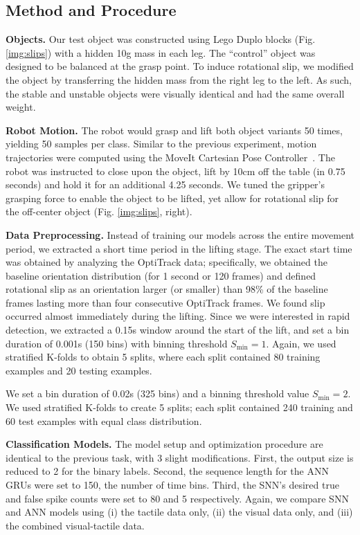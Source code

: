 \documentclass[fyp]{socreport}
\begin{document}
\subsection{Method and Procedure}

\noindent\textbf{Objects.} Our test object was constructed using Lego Duplo
blocks (Fig. \ref{img:slips}) with a hidden 10g mass in each leg. The
``control'' object was designed to be balanced at the grasp point. To induce
rotational slip, we modified the object by transferring the hidden mass from the
right leg to the left. As such, the stable and unstable objects were visually
identical and had the same overall weight.

\vspace{0.3em}
\noindent\textbf{Robot Motion.} The robot would grasp and lift both object
variants 50 times, yielding 50 samples per class. Similar to the previous
experiment, motion trajectories were computed using the MoveIt Cartesian Pose
Controller~\cite{coleman2014reducing}. The robot was instructed to close upon
the object, lift by 10cm off the table (in 0.75 seconds) and hold it for an
additional 4.25 seconds. We tuned the gripper's grasping force to enable the
object to be lifted, yet allow for rotational slip for the off-center object
(Fig. \ref{img:slips}, right).

\vspace{0.3em}
\noindent\textbf{Data Preprocessing.} Instead of training our models across the
entire movement period, we extracted a short time period in the lifting stage.
The exact start time was obtained by analyzing the OptiTrack data; specifically,
we obtained the baseline orientation distribution (for 1 second or 120 frames)
and defined rotational slip as an orientation larger (or smaller) than 98\% of
the baseline frames lasting more than four consecutive OptiTrack frames. We
found slip occurred almost immediately during the lifting. Since we were
interested in rapid detection, we extracted a 0.15s window around the start of
the lift, and set a bin duration of 0.001s (150 bins) with binning threshold
$S_\text{min} = 1$. Again, we used stratified K-folds to obtain 5 splits, where
each split contained 80 training examples and 20 testing examples.

We set a bin duration of 0.02s (325 bins) and a binning threshold value
$S_{\text{min}} = 2$. We used stratified K-folds to create 5 splits; each split
contained 240 training and 60 test examples with equal class distribution.

\vspace{0.3em}
\noindent\textbf{Classification Models.} The model setup and optimization
procedure are identical to the previous task, with 3 slight modifications.
First, the output size is reduced to 2 for the binary labels. Second, the
sequence length for the ANN GRUs were set to 150, the number of time bins.
Third, the SNN's desired true and false spike counts were set to 80 and 5
respectively. Again, we compare SNN and ANN models using (i) the tactile data
only, (ii) the visual data only, and (iii) the combined visual-tactile data.
\end{document}
